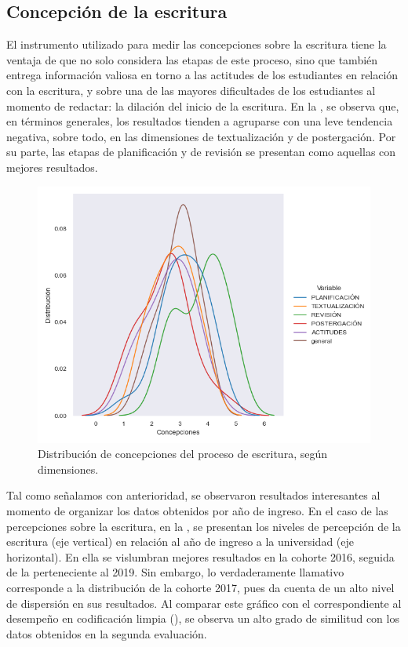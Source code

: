 \documentclass[spanish]{textolivre}
\begin{document}
\subsection{Concepción de la escritura}

El instrumento utilizado para medir las concepciones sobre la escritura tiene la ventaja de que no solo considera las etapas de este proceso, sino que también entrega información valiosa en torno a las actitudes de los estudiantes en relación con la escritura, y sobre una de las mayores dificultades de los estudiantes al momento de redactar: la dilación del inicio de la escritura. En la , se observa que, en términos generales, los resultados tienden a agruparse con una leve tendencia negativa, sobre todo, en las dimensiones de textualización y de postergación. Por su parte, las etapas de planificación y de revisión se presentan como aquellas con mejores resultados.

\begin{figure}[H]
\centering
\begin{minipage}{.75\textwidth}
 \includegraphics[width=\textwidth]{figuras/figura5.png}
 \caption{Distribución de concepciones del proceso de escritura, según dimensiones.}
 \label{fig-concepciones}
\end{minipage}
\end{figure}

Tal como señalamos con anterioridad, se observaron resultados interesantes al momento de organizar los datos obtenidos por año de ingreso. En el caso de las percepciones sobre la escritura, en la , se presentan los niveles de percepción de la escritura (eje vertical) en relación al año de ingreso a la universidad (eje horizontal). En ella se vislumbran mejores resultados en la cohorte 2016, seguida de la perteneciente al 2019. Sin embargo, lo verdaderamente llamativo corresponde a la distribución de la cohorte 2017, pues da cuenta de un alto nivel de dispersión en sus resultados. Al comparar este gráfico con el correspondiente al desempeño en codificación limpia (), se observa un alto grado de similitud con los datos obtenidos en la segunda evaluación.
\end{document}

